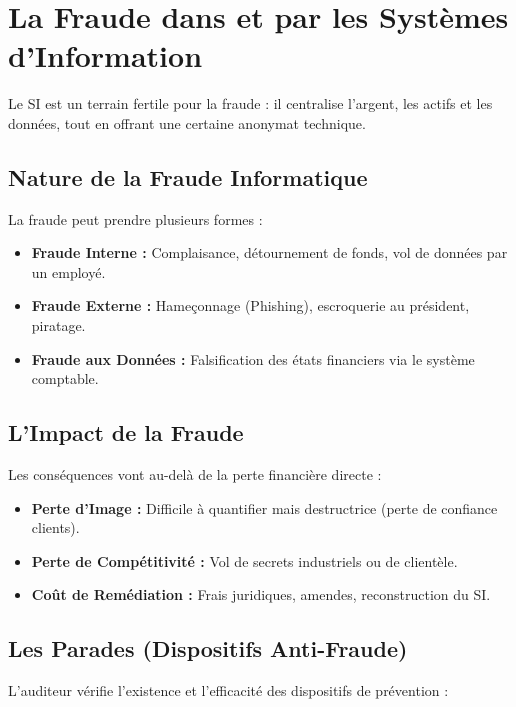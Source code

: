 \section{La Fraude dans et par les Systèmes d'Information}

Le SI est un terrain fertile pour la fraude : il centralise l'argent, les actifs et les données, tout en offrant une certaine anonymat technique.

\subsection{Nature de la Fraude Informatique}

La fraude peut prendre plusieurs formes :
\begin{itemize}
    \item \textbf{Fraude Interne :} Complaisance, détournement de fonds, vol de données par un employé.
    \item \textbf{Fraude Externe :} Hameçonnage (Phishing), escroquerie au président, piratage.
    \item \textbf{Fraude aux Données :} Falsification des états financiers via le système comptable.
\end{itemize}

\subsection{L'Impact de la Fraude}

Les conséquences vont au-delà de la perte financière directe :
\begin{itemize}
    \item \textbf{Perte d'Image :} Difficile à quantifier mais destructrice (perte de confiance clients).
    \item \textbf{Perte de Compétitivité :} Vol de secrets industriels ou de clientèle.
    \item \textbf{Coût de Remédiation :} Frais juridiques, amendes, reconstruction du SI.
\end{itemize}

\subsection{Les Parades (Dispositifs Anti-Fraude)}

L'auditeur vérifie l'existence et l'efficacité des dispositifs de prévention :

